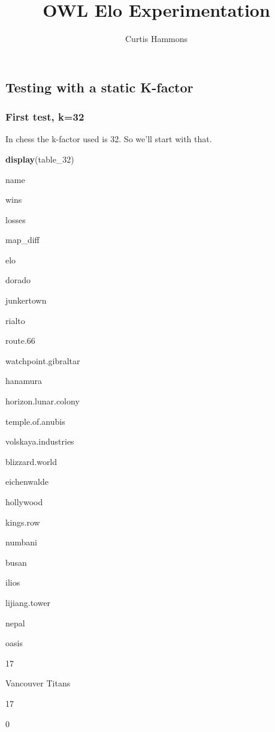 \documentclass[]{article}
\title{OWL Elo Experimentation}
\author{Curtis Hammons}
\date{}
\newenvironment{Shaded}{\begin{snugshade}}{\end{snugshade}}
\newcommand{\KeywordTok}[1]{\textcolor[rgb]{0.13,0.29,0.53}{\textbf{#1}}}
\newcommand{\DecValTok}[1]{\textcolor[rgb]{0.00,0.00,0.81}{#1}}
\newcommand{\NormalTok}[1]{#1}
\begin{document}
\maketitle

\subsection{Testing with a static
K-factor}\label{testing-with-a-static-k-factor}

\subsubsection{First test, k=32}\label{first-test-k32}

In chess the k-factor used is 32. So we'll start with that.

\begin{Shaded}
\begin{Highlighting}[]
\KeywordTok{display}\NormalTok{(table_}\DecValTok{32}\NormalTok{)}
\end{Highlighting}
\end{Shaded}

name

wins

losses

map\_diff

elo

dorado

junkertown

rialto

route.66

watchpoint.gibraltar

hanamura

horizon.lunar.colony

temple.of.anubis

volskaya.industries

blizzard.world

eichenwalde

hollywood

kings.row

numbani

busan

ilios

lijiang.tower

nepal

oasis

17

Vancouver Titans

17

0
\end{document}
